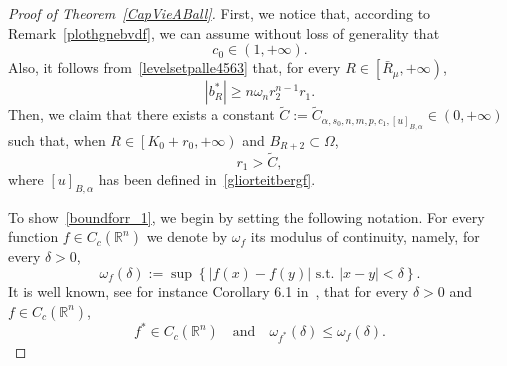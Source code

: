\documentclass[12pt]{article}
\newcommand{\R}{\mathbb{R}}
\numberwithin{equation}{section}
\renewcommand{\leq}{\leqslant}
\renewcommand{\geq}{\geqslant}
\begin{document}
\begin{proof}[Proof of Theorem~\ref{CapVieABall}]
First, we notice that, according to Remark~\ref{plothgnebvdf}, we can assume without loss of generality that 
\begin{equation*}
c_0\in (1,+\infty).
\end{equation*}
Also, it follows
from~\eqref{levelsetpalle4563} that, for every $R\in  \left[\bar{R}_\mu,+\infty\right)$,
\begin{equation}\label{misuradibstar}
\left|b_R^*\right|\geq n\omega_n  r_2^{n-1}r_1.
\end{equation}
Then, we claim that there exists a constant $\tilde{C}:=\tilde{C}_{\alpha,s_0,n,m,p,c_1,\left[u\right]_{B,\alpha}}\in (0,+\infty)$ such that, when $R\in \left[K_0+r_0,+\infty\right)$ and $B_{R+2}\subset\Omega$,
\begin{equation}\label{boundforr_1}
r_1> \tilde{C},  
\end{equation}
where $\left[u\right]_{B,\alpha}$ has been defined in~\eqref{gliorteitbergf}.

To show~\eqref{boundforr_1}, we begin by setting the following notation. For every function $f\in C_c(\R^n)$ we denote by $\omega_f$ its modulus of continuity, namely, for every $\delta>0$,
\begin{equation*}
\omega_f(\delta):=\sup \left\lbrace \left|f(x)-f(y)\right| \mbox{  s.t.  } \left|x-y\right|<\delta \right\rbrace.
\end{equation*}
It is well known, see for instance Corollary 6.1 in~\cite{MR1695019}, that for every $\delta>0$ and $f\in C_c(\R^n)$, 
\begin{equation*}
f^*\in C_c(\R^n)\quad \mbox{and}\quad \omega_{f^*}(\delta)\leq \omega_{f}(\delta).
\end{equation*}


\end{proof}
\end{document}
